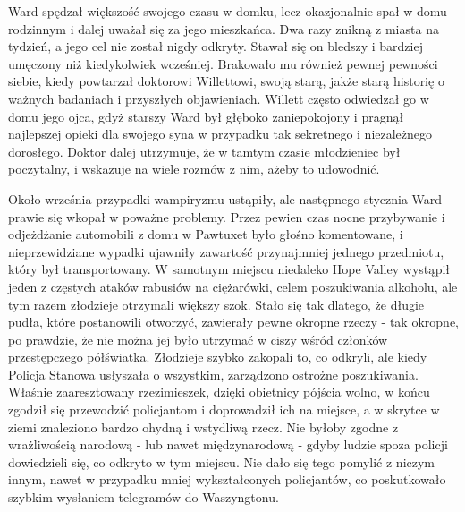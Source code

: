 Ward spędzał większość swojego czasu w domku, lecz okazjonalnie spał w domu rodzinnym i dalej uważał się za jego mieszkańca. Dwa razy znikną z miasta na tydzień, a jego cel nie został nigdy odkryty. Stawał się on bledszy i bardziej umęczony niż kiedykolwiek wcześniej. Brakowało mu również pewnej pewności siebie, kiedy powtarzał doktorowi Willettowi, swoją starą, jakże starą historię o ważnych badaniach i przyszłych objawieniach. Willett często odwiedzał go w domu jego ojca, gdyż starszy Ward był głęboko zaniepokojony i pragnął najlepszej opieki dla swojego syna w przypadku tak sekretnego i niezależnego dorosłego. Doktor dalej utrzymuje, że w tamtym czasie młodzieniec był poczytalny, i wskazuje na wiele rozmów z nim, ażeby to udowodnić. 

Około września przypadki wampiryzmu ustąpiły, ale następnego stycznia Ward prawie się wkopał w poważne problemy. Przez pewien czas nocne przybywanie i odjeżdżanie automobili z domu w Pawtuxet było głośno komentowane, i nieprzewidziane wypadki ujawniły zawartość przynajmniej jednego przedmiotu, który był transportowany. W samotnym miejscu niedaleko Hope Valley wystąpił jeden z częstych ataków rabusiów na ciężarówki, celem poszukiwania alkoholu, ale tym razem złodzieje otrzymali większy szok. Stało się tak dlatego, że długie pudła, które postanowili otworzyć, zawierały pewne okropne rzeczy - tak okropne, po prawdzie, że nie można jej było utrzymać w ciszy wśród członków przestępczego półświatka. Złodzieje szybko zakopali to, co odkryli, ale kiedy Policja Stanowa usłyszała o wszystkim, zarządzono ostrożne poszukiwania. Właśnie zaaresztowany rzezimieszek, dzięki obietnicy pójścia wolno, w końcu zgodził się przewodzić policjantom i doprowadził ich na miejsce, a w skrytce w ziemi znaleziono bardzo ohydną i wstydliwą rzecz. Nie byłoby zgodne z wrażliwością narodową - lub nawet międzynarodową - gdyby ludzie spoza policji dowiedzieli się, co odkryto w tym miejscu. Nie dało się tego pomylić z niczym innym, nawet w przypadku mniej wykształconych policjantów, co poskutkowało szybkim wysłaniem telegramów do Waszyngtonu. 

